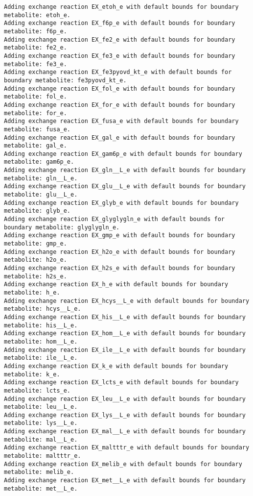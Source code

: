 \documentclass[
  letterpaper,
  DIV=11,
  numbers=noendperiod]{scrartcl}
\begin{document}
\begin{verbatim}
Adding exchange reaction EX_etoh_e with default bounds for boundary metabolite: etoh_e.
Adding exchange reaction EX_f6p_e with default bounds for boundary metabolite: f6p_e.
Adding exchange reaction EX_fe2_e with default bounds for boundary metabolite: fe2_e.
Adding exchange reaction EX_fe3_e with default bounds for boundary metabolite: fe3_e.
Adding exchange reaction EX_fe3pyovd_kt_e with default bounds for boundary metabolite: fe3pyovd_kt_e.
Adding exchange reaction EX_fol_e with default bounds for boundary metabolite: fol_e.
Adding exchange reaction EX_for_e with default bounds for boundary metabolite: for_e.
Adding exchange reaction EX_fusa_e with default bounds for boundary metabolite: fusa_e.
Adding exchange reaction EX_gal_e with default bounds for boundary metabolite: gal_e.
Adding exchange reaction EX_gam6p_e with default bounds for boundary metabolite: gam6p_e.
Adding exchange reaction EX_gln__L_e with default bounds for boundary metabolite: gln__L_e.
Adding exchange reaction EX_glu__L_e with default bounds for boundary metabolite: glu__L_e.
Adding exchange reaction EX_glyb_e with default bounds for boundary metabolite: glyb_e.
Adding exchange reaction EX_glyglygln_e with default bounds for boundary metabolite: glyglygln_e.
Adding exchange reaction EX_gmp_e with default bounds for boundary metabolite: gmp_e.
Adding exchange reaction EX_h2o_e with default bounds for boundary metabolite: h2o_e.
Adding exchange reaction EX_h2s_e with default bounds for boundary metabolite: h2s_e.
Adding exchange reaction EX_h_e with default bounds for boundary metabolite: h_e.
Adding exchange reaction EX_hcys__L_e with default bounds for boundary metabolite: hcys__L_e.
Adding exchange reaction EX_his__L_e with default bounds for boundary metabolite: his__L_e.
Adding exchange reaction EX_hom__L_e with default bounds for boundary metabolite: hom__L_e.
Adding exchange reaction EX_ile__L_e with default bounds for boundary metabolite: ile__L_e.
Adding exchange reaction EX_k_e with default bounds for boundary metabolite: k_e.
Adding exchange reaction EX_lcts_e with default bounds for boundary metabolite: lcts_e.
Adding exchange reaction EX_leu__L_e with default bounds for boundary metabolite: leu__L_e.
Adding exchange reaction EX_lys__L_e with default bounds for boundary metabolite: lys__L_e.
Adding exchange reaction EX_mal__L_e with default bounds for boundary metabolite: mal__L_e.
Adding exchange reaction EX_maltttr_e with default bounds for boundary metabolite: maltttr_e.
Adding exchange reaction EX_melib_e with default bounds for boundary metabolite: melib_e.
Adding exchange reaction EX_met__L_e with default bounds for boundary metabolite: met__L_e.

\end{verbatim}
\end{document}
